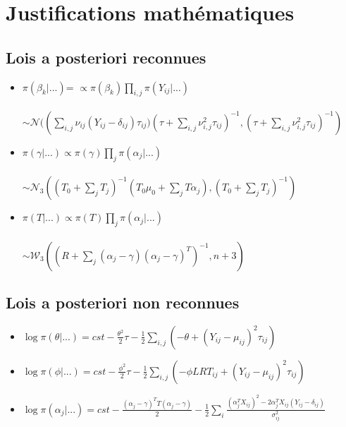  \section{Justifications mathématiques}
 
   \subsection{Lois a posteriori reconnues}

    \begin{itemize}
    
        \item 
        $\pi(\beta_k | ...)$= $ \propto \pi(\beta_k) \prod_{i,j} \pi(Y_{ij}|...)$ \\  
        \\
        $\sim \mathcal{N}((\sum_{i,j}{ \nu_{ij}(Y_{ij} - \delta_{ij}) \tau_{ij})}(\tau + \sum_{i,j}{ \nu_{i,j}^2 \tau_{ij}})^{-1} , (\tau + \sum_{i,j} \nu_{i,j}^2 \tau_{ij})^{-1})$

        
        \item $\pi(\gamma|...) \propto \pi(\gamma) \prod_j \pi(\alpha_j|...)$  
        \\
        \\
        $\sim \mathcal{N}_3 ((T_0 + \sum_j T_j)^{-1}(T_0 \mu_0 + \sum_j T \alpha_j) , (T_0 + \sum_j T_j)^{-1})$
        
        \item $\pi(T|...) \propto \pi(T) \prod_j \pi(\alpha_j|...)$ 
        \\
        \\
        $\sim \mathcal{W}_3((R+\sum_j(\alpha_j - \gamma)(\alpha_j - \gamma)^T)^{-1} , n+3)$
        
    \end{itemize}
    
    
    
   \subsection{Lois a posteriori non reconnues}

    \begin{itemize}
    
        \item $\log \pi(\theta|...) = cst - \frac{\theta^2}{2}\tau - \frac{1}{2}\sum_{i,j}(-\theta + (Y_{ij}-\mu_{ij})^2 \tau_{ij})$
        
        \item $\log \pi(\phi|...) = cst - \frac{\phi^2}{2}\tau - \frac{1}{2}\sum_{i,j}(-\phi LRT_{ij} + (Y_{ij}-\mu_{ij})^2 \tau_{ij})$
        
        \item $\log \pi(\alpha_j |...) = cst - \frac{(\alpha_j - \gamma)^T T (\alpha_j - \gamma)}{2} - \frac{1}{2} \sum_i \frac{(\alpha_j^T X_{ij})^2 - 2\alpha_j^T X_{ij} (Y_{ij} - \delta_{ij})}{\sigma_{ij}^2}$
        
    \end{itemize}
